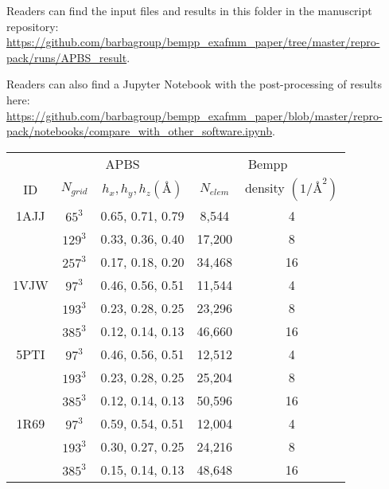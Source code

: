 \documentclass[11pt]{article}
\begin{document}
\bigskip

Readers can find the input files and results in this folder in the manuscript repository: \url{https://github.com/barbagroup/bempp_exafmm_paper/tree/master/repro-pack/runs/APBS_result}.

Readers can also find a Jupyter Notebook with the post-processing of results here: \url{https://github.com/barbagroup/bempp_exafmm_paper/blob/master/repro-pack/notebooks/compare_with_other_software.ipynb}.


\begin{table}[]
  \centering
  \begin{tabular}{c|cc|cc}
       & \multicolumn{2}{c|}{APBS}                     & \multicolumn{2}{c}{Bempp}                   \\
  ID   & $N_{grid}$ & $h_x, h_y, h_z (\si{\angstrom})$ & $N_{elem}$ & density $(1/\si{\angstrom}^2)$ \\ \hline
  1AJJ & $65^3$     & 0.65, 0.71, 0.79                 & 8,544      & 4                              \\
       & $129^3$    & 0.33, 0.36, 0.40                 & 17,200     & 8                              \\
       & $257^3$    & 0.17, 0.18, 0.20                 & 34,468     & 16                             \\ \hline
  1VJW & $97^3$     & 0.46, 0.56, 0.51                 & 11,544     & 4                              \\
       & $193^3$    & 0.23, 0.28, 0.25                 & 23,296     & 8                              \\
       & $385^3$    & 0.12, 0.14, 0.13                 & 46,660     & 16                             \\ \hline
  5PTI & $97^3$     & 0.46, 0.56, 0.51                 & 12,512     & 4                              \\
       & $193^3$    & 0.23, 0.28, 0.25                 & 25,204     & 8                              \\
       & $385^3$    & 0.12, 0.14, 0.13                 & 50,596     & 16                             \\ \hline
  1R69 & $97^3$     & 0.59, 0.54, 0.51                 & 12,004     & 4                              \\
       & $193^3$    & 0.30, 0.27, 0.25                 & 24,216     & 8                              \\
       & $385^3$    & 0.15, 0.14, 0.13                 & 48,648     & 16                             \\ \hline

\end{tabular}
\end{table}
\end{document}
